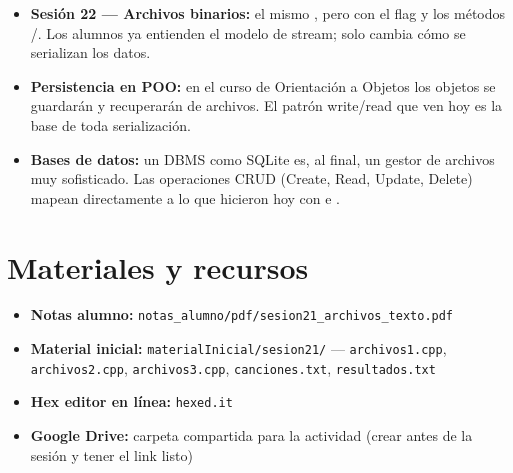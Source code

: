 \documentclass[12pt, oneside]{article}
\begin{document}
\begin{itemize}
  \item \textbf{Sesión 22 — Archivos binarios:} el mismo ,
        pero con el flag  y los métodos /.
        Los alumnos ya entienden el modelo de stream; solo cambia cómo se
        serializan los datos.
  \item \textbf{Persistencia en POO:} en el curso de Orientación a Objetos
        los objetos se guardarán y recuperarán de archivos.  El patrón
        write/read que ven hoy es la base de toda serialización.
  \item \textbf{Bases de datos:} un DBMS como SQLite es, al final, un
        gestor de archivos muy sofisticado.  Las operaciones CRUD
        (Create, Read, Update, Delete) mapean directamente a lo que
        hicieron hoy con  e .
\end{itemize}

\section{Materiales y recursos}

\begin{itemize}
  \item \textbf{Notas alumno:}
        \texttt{notas\_alumno/pdf/sesion21\_archivos\_texto.pdf}
  \item \textbf{Material inicial:}
        \texttt{materialInicial/sesion21/} — \texttt{archivos1.cpp},
        \texttt{archivos2.cpp}, \texttt{archivos3.cpp}, \texttt{canciones.txt},
        \texttt{resultados.txt}
  \item \textbf{Hex editor en línea:} \texttt{hexed.it}
  \item \textbf{Google Drive:} carpeta compartida para la actividad
        (crear antes de la sesión y tener el link listo)
\end{itemize}
\end{document}
